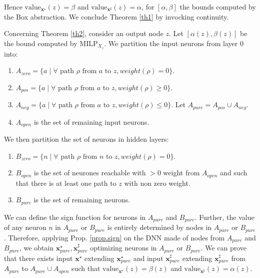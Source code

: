 \documentclass{llncs}
\newcommand{\vx}{\boldsymbol{x}}
\newcommand{\val}{{\textrm{value}}}
\newcommand{\MILP}{{\textrm{MILP}}}
\begin{document}
Hence $\val_{\vx^\star}(z)=\beta$ and $\val_{\vx^\sharp}(z)=\alpha$,
for $[\alpha, \beta]$ the bounds computed by the Box abstraction. We conclude Theorem \ref{th1} by invocking continuity.

\smallskip

Concerning Theorem \ref{th2}, consider an output node $z$.
Let $[\alpha(z),\beta(z)]$ be the bound computed by $\MILP_{X_z}$.
We partition the input neurons from layer $0$ into:
\begin{enumerate}
	\item $A_{zero}= \{a \mid \forall \text{ path $\rho$ from $a$ to } z, weight(\rho)=0\}$.
	\item $A_{pos}= \{a \mid \forall \text{ path $\rho$ from $a$ to } z, weight(\rho)\geq0\}$.
	\item  $A_{neg}= \{a \mid \forall \text{ path $\rho$ from $a$ to } z, weight(\rho)\leq0\}$.
	Let $A_{pure}=A_{pos} \cup A_{neg}$.
	\item $A_{open}$ is the set of remaining input neurons.
\end{enumerate}

We then partition the set of neurons in hidden layers: 
\begin{enumerate}
	\item $B_{zero}= \{n \mid \forall \text{ path $\rho$ from $n$ to } z, weight(\rho)=0\}$.
	\item $B_{open}$ is the set of neurones reachable with $>0$ weight from $A_{open}$ and such that there is at least one path to $z$ with non zero weight.
	\item $B_{pure}$ is the set of remaining neurons.
\end{enumerate}

We can define the sign function for neurons in $A_{pure}$ and $B_{pure}$.
Further, the value of any neuron $n$ in $A_{pure}$ or $B_{pure}$ is entirely determined by 
nodes in $A_{pure}$ or $B_{pure}$. Therefore, applying Prop. \ref{prop.sign} on the DNN
made of nodes from $A_{pure}$ and $B_{pure}$, we obtain 
$\vx_{pure}^\star,\vx_{pure}^\sharp$ optimizing neurons in $A_{pure}$ or $B_{pure}$.
We can prove that there exists input 
$\vx^\star$ extending $\vx_{pure}^\star$
and input $\vx_{pure}^\sharp$ extending $\vx_{pure}^\sharp$
from $A_{pure}$ to $A_{pure} \cup A_{open}$ such that 
$\val_{\vx^\star}(z)=\beta(z)$ and $\val_{\vx^\sharp}(z)=\alpha(z)$.
\end{document}
